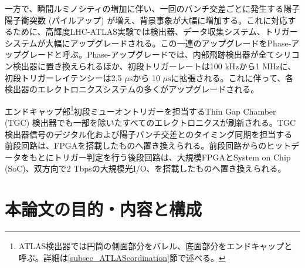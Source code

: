 一方で、瞬間ルミノシティの増加に伴い、一回のバンチ交差ごとに発生する陽子陽子衝突数 (パイルアップ) が増え、背景事象が大幅に増加する。これに対応するために、高輝度LHC-ATLAS実験では検出器、データ収集システム、トリガーシステムが大幅にアップグレードされる。この一連のアップグレードをPhase-\two アップグレードと呼ぶ。Phase-\two アップグレードでは、内部飛跡検出器が全てシリコン検出器に置き換えられるほか、初段トリガーレートは100 kHzから1 MHzに、初段トリガーレイテンシーは2.5 $\mu\mathrm{s}$から 10 $\mu\mathrm{s}$に拡張される。これに伴って、各検出器のエレクトロニクスシステムの多くがアップグレードされる。

エンドキャップ部\footnote{ATLAS検出器では円筒の側面部分をバレル、底面部分をエンドキャップと呼ぶ。詳細は\ref{subsec_ATLAScordination}節で述べる。}初段ミューオントリガーを担当するThin Gap Chamber (TGC) 検出器でも一部を除いたすべてのエレクトロニクスが刷新される。TGC検出器信号のデジタル化および陽子バンチ交差とのタイミング同期を担当する前段回路は、FPGAを搭載したものへ置き換えられる。前段回路からのヒットデータをもとにトリガー判定を行う後段回路は、大規模FPGAとSystem on Chip (SoC)、双方向で2 Tbpsの大規模光I/O、を搭載したものへ置き換えられる。





\section{本論文の目的・内容と構成}
\label{sec_intro_purpose}

